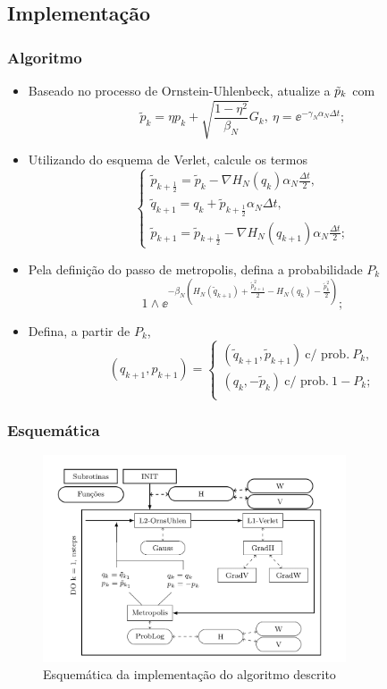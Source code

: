 \subsection{Implementação}
\begin{frame}
	\frametitle{Algoritmo}
	
		\begin{itemize}		
			\item<1> Baseado no processo de Ornstein-Uhlenbeck, atualize a $\tilde{p}_k$ com
			$$
				\tilde{p}_k = \eta p_k + \sqrt{\frac{1-\eta^2}{\beta_N}} G_k, \ \eta = \ee^{-\gamma_N \alpha_N \Delta t};
				\label{Equation: Alg Mehler}
			$$
			\item<2> Utilizando do esquema de Verlet, calcule os termos
			$$
				\begin{cases}
					\tilde{p}_{k+\frac{1}{2}} = \tilde{p}_k - \nabla H_N(q_k) \alpha_N \frac{\Delta t}{2}, \\
					\tilde{q}_{k+1} = q_k + \tilde{p}_{k + \frac{1}{2}} \alpha_N \Delta t, \\
					\tilde{p}_{k+1} = \tilde{p}_{k+\frac{1}{2}} - \nabla H_N(q_{k+1}) \alpha_N \frac{\Delta t}{2};
					\label{Equation: Alg Verlet}
				\end{cases}
			$$
			\item<3> Pela definição do passo de metropolis, defina a probabilidade $P_k$
			$$
				1 \wedge \ee^{ -\beta_N \left( H_N(\tilde{q}_{k+1}) + \frac{\tilde{p}^2_{k+1}}{2} - H_N(q_k) - \frac{\tilde{p}^2_k}{2} \right) };
			$$
			\item<4> Defina, a partir de $P_k$, 
			$$
				(q_{k+1}, p_{k+1}) = 
				\begin{cases}
					(\tilde{q}_{k+1}, \tilde{p}_{k+1}) \ \text{c/ prob.} \ P_k, \\
					(q_k, -\tilde{p}_{k}) \ \text{c/ prob.} \ 1-P_k; \\
				\end{cases}
			$$
		\end{itemize}

\end{frame}
\begin{frame}
	\frametitle{Esquemática}
	\begin{figure}
		\centering
		\includegraphics[width=0.8\textwidth]{./media/Results/Esquematics}	
		\caption{Esquemática da implementação do algoritmo descrito}
	\end{figure}
\end{frame}
